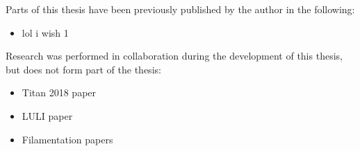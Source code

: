 
\begin{thesisdeclaration}

\noindent Parts of this thesis have been previously published by the author in the following:
\begin{itemize}
    \item lol i wish 1
\end{itemize}{}


\noindent Research was performed in collaboration during the development of this thesis, but does not form part of the thesis:
\begin{itemize}
    \item Titan 2018 paper
    \item LULI paper
    \item Filamentation papers
\end{itemize}{}

\end{thesisdeclaration}
